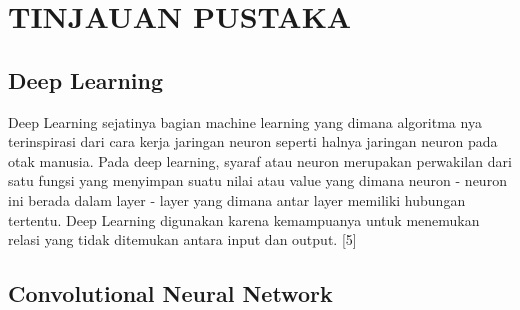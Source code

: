 \chapter{TINJAUAN PUSTAKA}
\label{chap:tinjauanpustaka}









\section{Deep Learning}
\label{sec:deeplearning}

Deep Learning sejatinya bagian machine learning yang dimana algoritma nya terinspirasi dari cara kerja jaringan neuron seperti halnya jaringan neuron pada otak manusia. Pada deep learning, syaraf atau neuron merupakan perwakilan dari satu fungsi yang menyimpan suatu nilai atau value yang dimana neuron - neuron ini berada dalam layer - layer yang dimana antar layer memiliki hubungan tertentu. Deep Learning digunakan karena kemampuanya untuk menemukan relasi yang tidak ditemukan antara input dan output. [5]


\section{Convolutional Neural Network}
\label{sec:convolutionalneuralnetwork}

